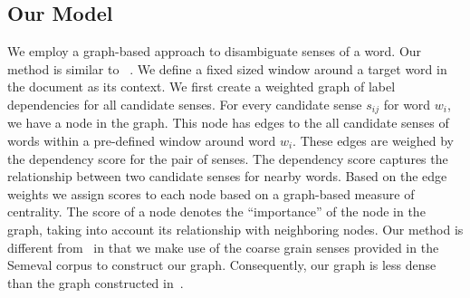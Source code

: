 \documentclass[12pt,letterpaper]{article}
\newcommand{\blue}[1]{\textcolor{RoyalBlue}{#1}}
\newcommand{\instructions}[1]{\blue{\textit{#1}}}
\begin{document}
\subsection{Our Model}
\label{sec:proposed-models}
We employ a graph-based approach to disambiguate senses of a word. Our method is similar to ~\cite{Sinha}. We define a fixed sized window around a target word in the document as its context. We first create a weighted graph of label dependencies for all candidate senses. For every candidate sense $s_{ij}$ for word $w_i$, we have a node in the graph. This node has edges to the all candidate senses of words within a pre-defined window around word $w_i$. These edges are weighed by the dependency score for the pair of senses. The dependency score captures the relationship between two candidate senses for nearby words. Based on the edge weights we assign scores to each node based on a graph-based measure of centrality. The score of a node denotes the ``importance'' of the node in the graph, taking into account its relationship with neighboring nodes.
Our method is different from~\cite{Sinha} in that we make use of the coarse grain senses provided in the Semeval corpus to construct our graph. Consequently, our graph is less dense than the graph constructed in~\cite{Sinha}.
\end{document}
